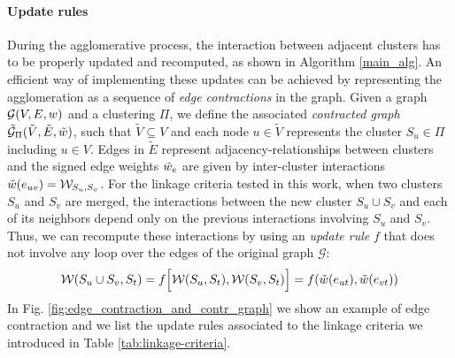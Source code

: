 \paragraph*{Update rules} During the agglomerative process, the interaction between adjacent clusters has to be properly updated and recomputed, as shown in Algorithm \ref{main_alg}.  %
An efficient way of implementing these updates can be achieved by representing the agglomeration as a sequence of \emph{edge contractions} in the graph. Given a graph $\mathcal{G}(V,E,w)$ and a clustering $\Pi$, we define the associated \emph{contracted graph} $\tilde{\mathcal{G}}_\Pi(\tilde{V}, \tilde{E}, \tilde{w})$, such that $\tilde{V} \subseteq V$ and each node $u\in \tilde{V}$ represents the cluster $S_u \in \Pi$ including $u\in V$. Edges in $\tilde{E}$ represent adjacency-relationships between clusters 
and the signed edge weights $\tilde{w}_e$ are given by inter-cluster interactions $\tilde{w}(e_{uv})=\mathcal{W}_{S_u,S_v}$. 
For the linkage criteria tested in this work, when two clusters $S_u$ and $S_v$ are merged, the interactions between the new cluster $S_u \cup S_v$ and each of its neighbors depend only on the previous interactions involving $S_u$ and $S_v$. Thus, we can recompute these interactions by using an \emph{update rule} $f$ that does not involve any loop over the edges of the original graph $\mathcal{G}$:
\begin{equation}
  \interact(S_u \cup S_v,S_t) = f\Big[ \interact(S_u,S_t), \interact(S_v,S_t) \Big] = f(\tilde{\cost}(e_{ut}), \tilde{\cost}(e_{vt})) %
\end{equation}
In Fig. \ref{fig:edge_contraction_and_contr_graph} we show an example of edge contraction and we list the update rules associated to the linkage criteria we introduced in Table \ref{tab:linkage-criteria}.

